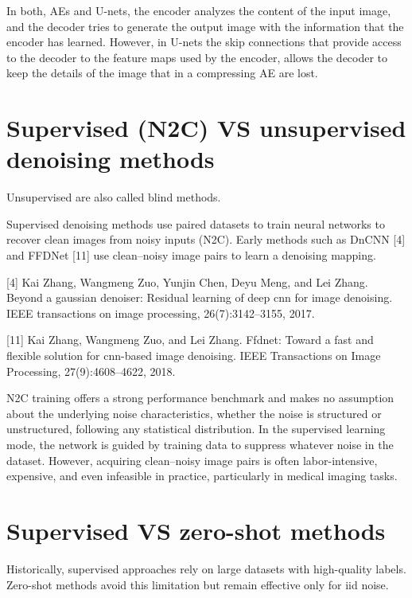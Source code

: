 In both, AEs and U-nets, the encoder analyzes the content of the input
image, and the decoder tries to generate the output image with the
information that the encoder has learned. However, in U-nets the skip
connections that provide access to the decoder to the feature maps
used by the encoder, allows the decoder to keep the details of the
image that in a compressing AE are lost.

\section{Supervised (N2C) VS unsupervised denoising methods}

Unsupervised are also called blind methods. %

Supervised denoising methods use paired datasets to train neural
networks to recover clean images from noisy inputs (N2C).  Early methods
such as DnCNN [4] and FFDNet [11] use clean–noisy image pairs to
learn a denoising mapping. %

[4] Kai Zhang, Wangmeng Zuo, Yunjin Chen, Deyu Meng, and Lei Zhang. Beyond a gaussian denoiser: Residual
learning of deep cnn for image denoising. IEEE transactions on image processing, 26(7):3142–3155, 2017.

[11] Kai Zhang, Wangmeng Zuo, and Lei Zhang. Ffdnet: Toward a fast and flexible solution for cnn-based image
denoising. IEEE Transactions on Image Processing, 27(9):4608–4622, 2018.

N2C training offers a strong performance benchmark and makes no
assumption about the underlying noise characteristics, whether the
noise is structured or unstructured, following any statistical
distribution. In the supervised learning mode, the network is guided
by training data to suppress whatever noise in the dataset. However,
acquiring clean–noisy image pairs is often labor-intensive, expensive,
and even infeasible in practice, particularly in medical imaging
tasks.  %

\section{Supervised VS zero-shot methods}
Historically, supervised approaches rely on large datasets with high-quality
labels. Zero-shot methods avoid this limitation but remain effective
only for \gls{iid} noise. %


